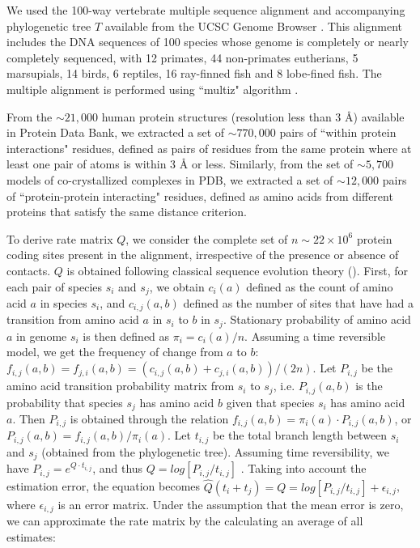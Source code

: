 We used the 100-way vertebrate multiple sequence alignment and accompanying phylogenetic tree $T$ available from the UCSC Genome Browser \cite{karolchik2014ucsc}. This alignment includes the DNA sequences of 100 species whose genome is completely or nearly completely sequenced, with 12 primates, 44 non-primates eutherians, 5 marsupials, 14 birds, 6 reptiles, 16 ray-finned fish and 8 lobe-fined fish.
The multiple alignment is performed using ``multiz" algorithm \cite{blanchette2004aligning,kielbasa2011adaptive}.

From the $\sim 21,000$ human protein structures (resolution less than $3$ \r{A}) available in Protein Data Bank, we extracted a set of $\sim770,000$ pairs of ``within protein interactions" residues, defined as pairs of residues from the same protein where at least one pair of atoms is within $3$ \r{A}  or less. Similarly, from the set of $\sim5,700$ models of co-crystallized complexes in PDB, we extracted a set of $\sim12,000$ pairs of ``protein-protein interacting" residues, defined as amino acids from different proteins that satisfy the same distance criterion.

To derive rate matrix $Q$, we consider the complete set of $n \sim 22 \times 10^6$ protein coding sites present in the alignment, irrespective of the presence or absence of contacts. $Q$ is obtained following classical sequence evolution theory (\cite{yang2006computational, felsenstein2004inferring}). First, for each pair of species  $s_i$ and $s_j$, we obtain $c_i(a)$ defined as the count of amino acid $a$ in species $s_i$, and $c_{i,j}(a,b)$ defined as the number of sites that have had a transition from amino acid $a$ in $s_i$ to $b$ in $s_j$. Stationary probability of amino acid $a$ in genome $s_i$ is then defined as $\pi_i = c_i(a)/n$. Assuming a time reversible model, we get the frequency of change from $a$ to $b$: $f_{i,j}(a,b) = f_{j,i}(a,b) = (c_{i,j}(a,b) + c_{j,i}(a,b))/(2n)$. Let $P_{i,j}$ be the amino acid transition probability matrix from $s_i$ to $s_j$, i.e. $P_{i,j}(a,b)$ is the probability that species $s_j$ has amino acid $b$ given that species $s_i$ has amino acid $a$. Then $P_{i,j}$ is obtained through the relation $f_{i,j}(a,b) = \pi_i(a) \cdot P_{i,j}(a,b)$, or $P_{i,j}(a,b) =   f_{i,j}(a,b) /  \pi_i(a)$.  Let $t_{i,j}$ be the total branch length between $s_i$ and $s_j$ (obtained from the phylogenetic tree). Assuming time reversibility, we have $P_{i,j} = e^{Q \cdot t_{i,j}}$, and thus $Q=log[ P_{i,j} / t_{i,j} ]$ \cite{yang2006computational}. Taking into account the estimation error, the equation becomes $\hat{Q}(t_i+t_j) = Q = log[ P_{i,j} / t_{i,j} ] + \epsilon_{i,j}$, where $\epsilon_{i,j}$ is an error matrix. Under the assumption that the mean error is zero, we can approximate the rate matrix by the calculating an average of all estimates:

